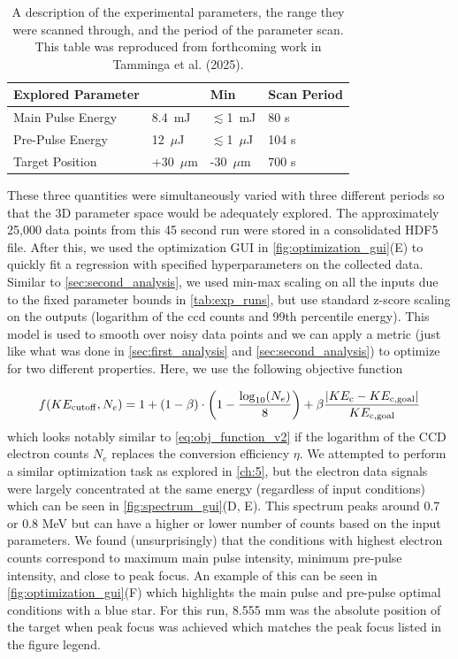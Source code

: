 \begin{table}
	\centering
	\begin{tabular}{|p{4cm}|p{1.5cm}|p{1.5cm}|p{3cm}|}
		\hline
		\textbf{Explored Parameter} & \text{Max} & \textbf{Min} & \textbf{Scan Period}\\
		\hline
		Main Pulse Energy & 8.4~mJ & $\lesssim$1~mJ & 80 s\\
		\hline
		Pre-Pulse Energy & 12~$\mu$J & $\lesssim$1~$\mu$J & 104 s\\
		\hline
		Target Position & +30~$\mu$m & -30~$\mu$m & 700 s\\
		\hline
	\end{tabular}
	\caption{A description of the experimental parameters, the range they were scanned through, and the period of the parameter scan. This table was reproduced from forthcoming work in Tamminga et al. (2025).}
	\label{tab:exp_runs}
\end{table}

These three quantities were simultaneously varied with three different periods so that the 3D parameter space would be adequately explored. The approximately 25,000 data points from this 45 second run were stored in a consolidated \gls{HDF5} file. After this, we used the optimization \gls{GUI} in \autoref{fig:optimization_gui}(E) to quickly fit a regression with specified hyperparameters on the collected data. Similar to \autoref{sec:second_analysis}, we used min-max scaling on all the inputs due to the fixed parameter bounds in \autoref{tab:exp_runs}, but use standard z-score scaling on the outputs (logarithm of the ccd counts and 99th percentile energy). This model is used to smooth over noisy data points and we can apply a metric (just like what was done in \autoref{sec:first_analysis} and \autoref{sec:second_analysis}) to optimize for two different properties. Here, we use the following objective function

\begin{equation}
	f(KE_{\rm cutoff},N_{e})  =  1 + (1 - \beta) \cdot \left(1 -  \frac{\log_{10}(N_{e})}{8} \right) + \beta \frac{|KE_{\rm c} - KE_{\rm c,goal}|}{KE_{\rm c, goal}} \label{eq:obj_function_daq}
\end{equation}
which looks notably similar to \autoref{eq:obj_function_v2} if the logarithm of the \gls{CCD} electron counts $N_e$ replaces the conversion efficiency $\eta$. We attempted to perform a similar optimization task as explored in \autoref{ch:5}, but the electron data signals were largely concentrated at the same energy (regardless of input conditions) which can be seen in \autoref{fig:spectrum_gui}(D, E). This spectrum peaks around 0.7 or 0.8 MeV but can have a higher or lower number of counts based on the input parameters. We found (unsurprisingly) that the conditions with highest electron counts correspond to maximum main pulse intensity, minimum pre-pulse intensity, and close to peak focus. An example of this can be seen in \autoref{fig:optimization_gui}(F) which highlights the main pulse and pre-pulse optimal conditions with a blue star. For this run, 8.555 mm was the absolute position of the target when peak focus was achieved which matches the peak focus listed in the figure legend.

